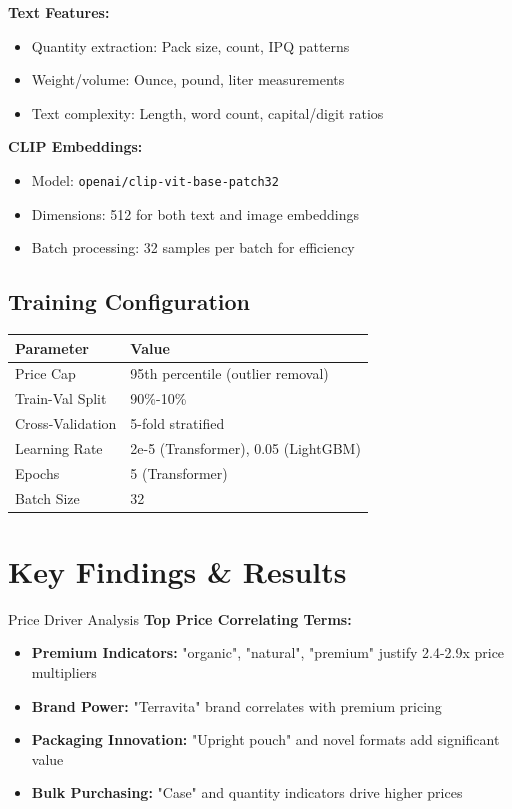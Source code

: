 \documentclass[10pt,a4paper]{article}
\begin{document}
\textbf{Text Features:}
\begin{itemize}[itemsep=0.1em]
    \item Quantity extraction: Pack size, count, IPQ patterns
    \item Weight/volume: Ounce, pound, liter measurements  
    \item Text complexity: Length, word count, capital/digit ratios
\end{itemize}

\textbf{CLIP Embeddings:}
\begin{itemize}[itemsep=0.1em]
    \item Model: \texttt{openai/clip-vit-base-patch32}
    \item Dimensions: 512 for both text and image embeddings
    \item Batch processing: 32 samples per batch for efficiency
\end{itemize}

\subsection{Training Configuration}

\begin{center}
\begin{tabular}{ll}
\toprule
\textbf{Parameter} & \textbf{Value} \\
\midrule
Price Cap & 95th percentile (outlier removal) \\
Train-Val Split & 90\%-10\% \\
Cross-Validation & 5-fold stratified \\
Learning Rate & 2e-5 (Transformer), 0.05 (LightGBM) \\
Epochs & 5 (Transformer) \\
Batch Size & 32 \\
\bottomrule
\end{tabular}
\end{center}

\section{\textcolor{primarycolor}{Key Findings \& Results}}

\begin{insightbox}{Price Driver Analysis}
\textbf{Top Price Correlating Terms:}
\begin{itemize}[itemsep=0.1em]
    \item \textbf{Premium Indicators:} "organic", "natural", "premium" justify 2.4-2.9x price multipliers
    \item \textbf{Brand Power:} "Terravita" brand correlates with premium pricing
    \item \textbf{Packaging Innovation:} "Upright pouch" and novel formats add significant value
    \item \textbf{Bulk Purchasing:} "Case" and quantity indicators drive higher prices
\end{itemize}
\end{insightbox}
\end{document}
